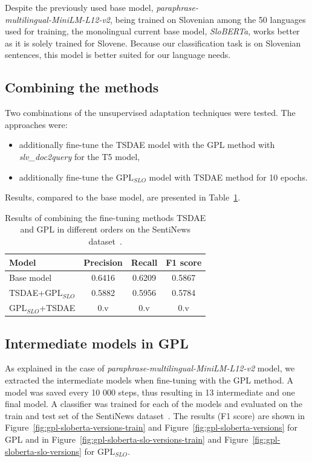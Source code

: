 \documentclass[fleqn,moreauthors,10pt]{ds_report}
\begin{document}
Despite the previously used base model, {\it paraphrase-\\multilingual-MiniLM-L12-v2}, being trained on Slovenian among the 50 languages used
for training, the monolingual current base model, {\it SloBERTa}, works better as it is solely trained for Slovene.
Because our classification task is on Slovenian sentences, this model is better suited for our language needs.


\subsection*{Combining the methods}
Two combinations of the unsupervised adaptation techniques were tested. The approaches were:
\begin{itemize}
	\item additionally fine-tune the TSDAE model with the GPL method with {\it slv\_doc2query} for the T5 model,
	\item additionally fine-tune the $\text{GPL}_{SLO}$ model with TSDAE method for 10 epochs.
\end{itemize}
Results, compared to the base model, are presented in Table~\ref{tab5}.

\begin{table}[!h]
	\footnotesize
	\begin{center}
		\begin{tabular}{ |l|c|c|c| }
		\hline
		\rowcolor{Blue}Model & Precision & Recall & F1 score\\
		\hline

		Base model & 0.6416 & 0.6209 & 0.5867\\
		TSDAE+$\text{GPL}_{SLO}$ & 0.5882 & 0.5956 & 0.5784\\
		$\text{GPL}_{SLO}$+TSDAE & 0.v & 0.v & 0.v\\

		\hline
		\end{tabular}
	\end{center}
\caption{Results of combining the fine-tuning methods TSDAE and GPL in different orders on the SentiNews dataset~\cite{sentiNews}.}
\label{tab5}
\end{table}



\subsection*{Intermediate models in GPL}
As explained in the case of {\it paraphrase-multilingual-MiniLM-L12-v2} model, we extracted the intermediate models when fine-tuning with the GPL method. A model was saved every 10 000 steps, thus resulting in 13 intermediate and one final model. A classifier was trained for each of the models and evaluated on the train and test set of the SentiNews dataset~\cite{sentiNews}. The results (F1 score) are shown in Figure~\ref{fig:gpl-sloberta-versions-train} and Figure~\ref{fig:gpl-sloberta-versions} for GPL and in Figure~\ref{fig:gpl-sloberta-slo-versions-train} and Figure~\ref{fig:gpl-sloberta-slo-versions} for $\text{GPL}_{SLO}$.
\end{document}
